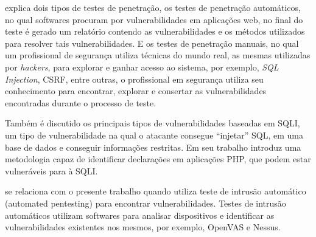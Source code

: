  explica dois tipos de testes de penetração, os testes de penetração automáticos, no qual softwares procuram por vulnerabilidades em aplicações web, no final do teste é gerado um relatório contendo as vulnerabilidades e os métodos utilizados para resolver tais vulnerabilidades. E os testes de penetração manuais, no qual um profissional de segurança utiliza técnicas do mundo real, as mesmas utilizadas por \textit{hackers}, para explorar e ganhar acesso ao sistema, por exemplo, \textit{SQL Injection}, \gls{CSRF}, entre outras, o profissional em segurança utiliza seu conhecimento para encontrar, explorar e consertar as vulnerabilidades encontradas durante o processo de teste.

Também é discutido os principais tipos de vulnerabilidades baseadas em \gls{SQLI}, um tipo de vulnerabilidade na qual o atacante consegue ``injetar'' \gls{SQL}, em uma base de dados e conseguir informações restritas. Em seu trabalho  introduz uma metodologia capaz de identificar declarações em aplicações \gls{PHP}, que podem estar vulneráveis para à \gls{SQLI}.

 se relaciona com o presente trabalho quando utiliza teste de intrusão automático (automated pentesting) para encontrar vulnerabilidades. Testes de intrusão automáticos utilizam softwares para analisar dispositivos e identificar as vulnerabilidades existentes nos mesmos, por exemplo, \gls{OpenVAS} e Nessus.


